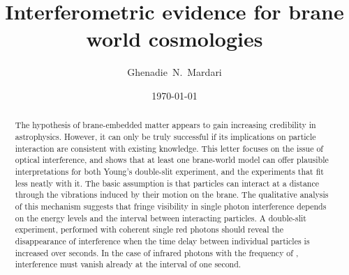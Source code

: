 \documentclass[a4paper,aps,prl,twocolumn,showpacs]{revtex4}
\begin{document}
\title{Interferometric evidence for brane world cosmologies}

\author{Ghenadie~N.~Mardari}


\date{\today}

\begin{abstract}
The hypothesis of brane-embedded matter appears to gain increasing
credibility in astrophysics. However, it can only be truly
successful if its implications on particle interaction are
consistent with existing knowledge. This letter focuses on the
issue of optical interference, and shows that at least one
brane-world model can offer plausible interpretations for both
Young's double-slit experiment, and the experiments that fit less
neatly with it. The basic assumption is that particles can
interact at a distance through the vibrations induced by their
motion on the brane. The qualitative analysis of this mechanism
suggests that fringe visibility in single photon interference
depends on the energy levels and the interval between interacting
particles. A double-slit experiment, performed with coherent
single red photons should reveal the disappearance of interference
when the time delay between individual particles is increased over
\coordHE{} seconds. In the case of infrared photons with the frequency
of \coordHE{}, interference must vanish already at the
interval of one second.
\end{abstract}


\maketitle
\end{document}
